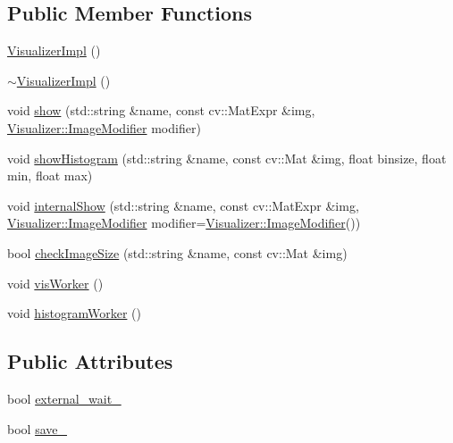 \subsection*{Public Member Functions}
\begin{DoxyCompactItemize}
\item 
\mbox{\hyperlink{classdvo_1_1visualization_1_1_visualizer_impl_ac9bacd20873b2204c007d8ae897dd793}{Visualizer\+Impl}} ()
\item 
\mbox{\hyperlink{classdvo_1_1visualization_1_1_visualizer_impl_ab2671b8d7b177f4833e308034eeee6a5}{$\sim$\+Visualizer\+Impl}} ()
\item 
void \mbox{\hyperlink{classdvo_1_1visualization_1_1_visualizer_impl_a2076b6b3056314a8bacacdf2fbbfff71}{show}} (std\+::string \&name, const cv\+::\+Mat\+Expr \&img, \mbox{\hyperlink{classdvo_1_1visualization_1_1_visualizer_ac33e0b53e7ef7be64e3230f6c91084a0}{Visualizer\+::\+Image\+Modifier}} modifier)
\item 
void \mbox{\hyperlink{classdvo_1_1visualization_1_1_visualizer_impl_a3afe414ca4a899c77458a1a0f1139dbc}{show\+Histogram}} (std\+::string \&name, const cv\+::\+Mat \&img, float binsize, float min, float max)
\item 
void \mbox{\hyperlink{classdvo_1_1visualization_1_1_visualizer_impl_ab7dc97f7e3e3444fb5337fd0e393a237}{internal\+Show}} (std\+::string \&name, const cv\+::\+Mat\+Expr \&img, \mbox{\hyperlink{classdvo_1_1visualization_1_1_visualizer_ac33e0b53e7ef7be64e3230f6c91084a0}{Visualizer\+::\+Image\+Modifier}} modifier=\mbox{\hyperlink{classdvo_1_1visualization_1_1_visualizer_ac33e0b53e7ef7be64e3230f6c91084a0}{Visualizer\+::\+Image\+Modifier}}())
\item 
bool \mbox{\hyperlink{classdvo_1_1visualization_1_1_visualizer_impl_a0401f138611fc10aa4c8ef3bfb37d02f}{check\+Image\+Size}} (std\+::string \&name, const cv\+::\+Mat \&img)
\item 
void \mbox{\hyperlink{classdvo_1_1visualization_1_1_visualizer_impl_acc30618615be0c6b9d54959a1beaf5e7}{vis\+Worker}} ()
\item 
void \mbox{\hyperlink{classdvo_1_1visualization_1_1_visualizer_impl_aaa9bdf78dde7df4c88fa61c05bfb13bd}{histogram\+Worker}} ()
\end{DoxyCompactItemize}
\subsection*{Public Attributes}
\begin{DoxyCompactItemize}
\item 
bool \mbox{\hyperlink{classdvo_1_1visualization_1_1_visualizer_impl_ae8de60588232e3a67c19e840f8363e2c}{external\+\_\+wait\+\_\+}}
\item 
bool \mbox{\hyperlink{classdvo_1_1visualization_1_1_visualizer_impl_a9142982073b53d888e0533ccf552d903}{save\+\_\+}}
\end{DoxyCompactItemize}


